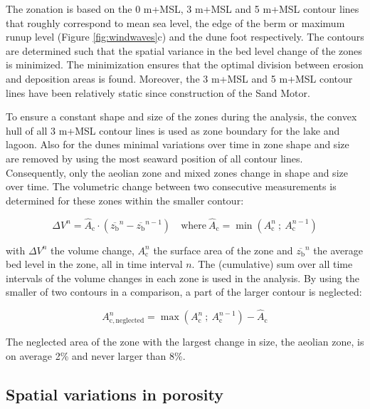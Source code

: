 The zonation is based on the 0 m+MSL, 3 m+MSL and 5 m+MSL contour
lines that roughly correspond to mean sea level, the edge of the berm
or maximum runup level (Figure \ref{fig:windwaves}c) and the dune foot
respectively. The contours are determined such that the spatial
variance in the bed level change of the zones is minimized. The
minimization ensures that the optimal division between erosion and
deposition areas is found. Moreover, the 3 m+MSL and 5 m+MSL contour
lines have been relatively static since construction of the Sand
Motor.

To ensure a constant shape and size of the zones during the analysis,
the convex hull of all 3 m+MSL contour lines is used as zone boundary
for the lake and lagoon. Also for the dunes minimal variations over
time in zone shape and size are removed by using the most seaward
position of all contour lines. Consequently, only the aeolian zone and
mixed zones change in shape and size over time. The volumetric change
between two consecutive measurements is determined for these zones
within the smaller contour:

\begin{equation}
  \Delta V^n = \hat{A}_{\mathrm{c}} \cdot \left( \overline{z_{\mathrm{b}}}^n - \overline{z_{\mathrm{b}}}^{n-1} \right)
  \quad \mathrm{where} ~ \hat{A}_{\mathrm{c}} = \min \left( A_{\mathrm{c}}^n ~;~ A_{\mathrm{c}}^{n-1} \right)
\end{equation}

\noindent with $\Delta V^n$ the volume change, $A_{\mathrm{c}}^n$ the
surface area of the zone and $\overline{z_{\mathrm{b}}}^n$ the average
bed level in the zone, all in time interval $n$. The (cumulative) sum
over all time intervals of the volume changes in each zone is used in
the analysis. By using the smaller of two contours in a comparison, a
part of the larger contour is neglected:

\begin{equation}
  A^n_{\mathrm{c,neglected}} = \max \left( A_{\mathrm{c}}^n ~;~ A_{\mathrm{c}}^{n-1} \right) - \hat{A}_{\mathrm{c}}
\end{equation}

\noindent The neglected area of the zone with the largest change in
size, the aeolian zone, is on average 2\% and never larger than 8\%.

\subsection{Spatial variations in porosity}

